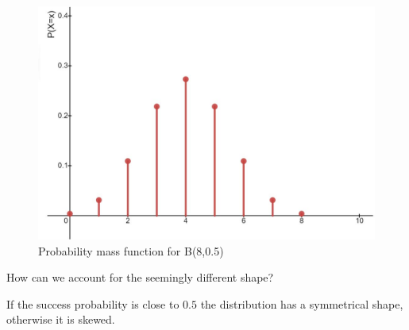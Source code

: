 \documentclass[
]{book}
\theoremstyle{definition}
\theoremstyle{definition}
\theoremstyle{definition}
\theoremstyle{definition}
\theoremstyle{remark}
\begin{document}
\begin{figure}

{\centering \includegraphics[width=0.75\linewidth]{./figures/binomial2} 

}

\caption{Probability mass function for B(8,0.5)}\label{fig:bin2}
\end{figure}

How can we account for the seemingly different shape?

If the success probability is close to \(0.5\) the distribution has a symmetrical shape, otherwise it is skewed.
\end{document}
